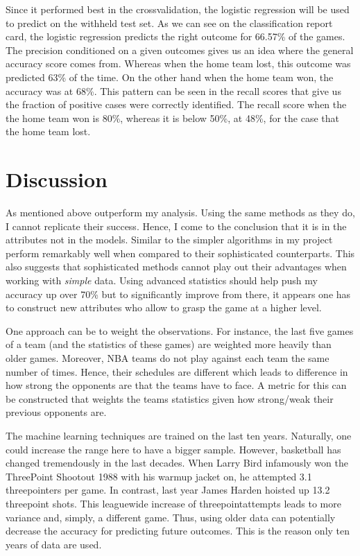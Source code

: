 \documentclass[11pt, a4paper, leqno]{article}
\begin{document}
Since it performed best in the cross\-validation, the logistic regression will be used to predict on the withheld test set. As we can see on the classification report card, the logistic regression predicts the right outcome for 66.57\% of the games. The precision conditioned on a given outcomes gives us an idea where the general accuracy score comes from. Whereas when the home team lost, this outcome was predicted 63\% of the time. On the other hand when the home team won, the accuracy was at 68\%. This pattern can be seen in the recall scores that give us the fraction of positive cases were correctly identified. The recall score when the the home team won is 80\%, whereas it is below 50\%, at 48\%, for the case that the home team lost.

\section{Discussion}

As mentioned above \cite{Zimbo} outperform my analysis. Using the same methods as they do, I cannot replicate their success.  Hence, I come to the conclusion that it is in the attributes not in the models. Similar to \cite{Zimbo} the simpler algorithms in my project perform remarkably well when compared to their sophisticated counterparts. This also suggests that sophisticated methods cannot play out their advantages when working with \textit{simple} data. Using advanced statistics should help push my accuracy up over 70\% but to significantly improve from there, it appears one has to construct new attributes who allow to grasp the game at a higher level.

One approach can be to weight the observations. For instance, the last five games of a team (and the statistics of these games) are weighted more heavily than older games. Moreover, NBA teams do not play against each team the same number of times. Hence, their schedules are different which leads to difference in how strong the opponents are that the teams have to face. A metric for this can be constructed that weights the teams statistics given how strong/weak their previous opponents are.

The machine learning techniques are trained on the last ten years. Naturally, one could increase the range here to have a bigger sample. However, basketball has changed tremendously in the last decades. When Larry Bird infamously won the Three\-Point Shootout 1988 with his warm\-up jacket on, he attempted 3.1 three\-pointers per game. In contrast, last year James Harden hoisted up 13.2 three\-point shots. This league\-wide increase of three\-point\-attempts leads to more variance and, simply, a different game. Thus, using older data can potentially decrease the accuracy for predicting future outcomes. This is the reason only ten years of data are used.
\end{document}
